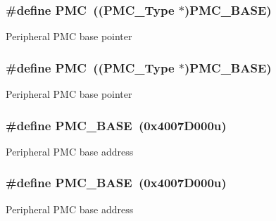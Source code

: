 \subsubsection[{\texorpdfstring{P\+MC}{PMC}}]{\setlength{\rightskip}{0pt plus 5cm}\#define P\+MC~(({\bf P\+M\+C\+\_\+\+Type} $\ast$){\bf P\+M\+C\+\_\+\+B\+A\+SE})}\hypertarget{group__PMC__Peripheral__Access__Layer_ga979c6d379c67bc2f3e8eb6efcb509f69}{}\label{group__PMC__Peripheral__Access__Layer_ga979c6d379c67bc2f3e8eb6efcb509f69}
Peripheral P\+MC base pointer 
\subsubsection[{\texorpdfstring{P\+MC}{PMC}}]{\setlength{\rightskip}{0pt plus 5cm}\#define P\+MC~(({\bf P\+M\+C\+\_\+\+Type} $\ast$){\bf P\+M\+C\+\_\+\+B\+A\+SE})}\hypertarget{group__PMC__Peripheral__Access__Layer_ga979c6d379c67bc2f3e8eb6efcb509f69}{}\label{group__PMC__Peripheral__Access__Layer_ga979c6d379c67bc2f3e8eb6efcb509f69}
Peripheral P\+MC base pointer 
\subsubsection[{\texorpdfstring{P\+M\+C\+\_\+\+B\+A\+SE}{PMC_BASE}}]{\setlength{\rightskip}{0pt plus 5cm}\#define P\+M\+C\+\_\+\+B\+A\+SE~(0x4007\+D000u)}\hypertarget{group__PMC__Peripheral__Access__Layer_ga4e92bd47dc68cc81e62c344586a4cdfa}{}\label{group__PMC__Peripheral__Access__Layer_ga4e92bd47dc68cc81e62c344586a4cdfa}
Peripheral P\+MC base address 
\subsubsection[{\texorpdfstring{P\+M\+C\+\_\+\+B\+A\+SE}{PMC_BASE}}]{\setlength{\rightskip}{0pt plus 5cm}\#define P\+M\+C\+\_\+\+B\+A\+SE~(0x4007\+D000u)}\hypertarget{group__PMC__Peripheral__Access__Layer_ga4e92bd47dc68cc81e62c344586a4cdfa}{}\label{group__PMC__Peripheral__Access__Layer_ga4e92bd47dc68cc81e62c344586a4cdfa}
Peripheral P\+MC base address 
